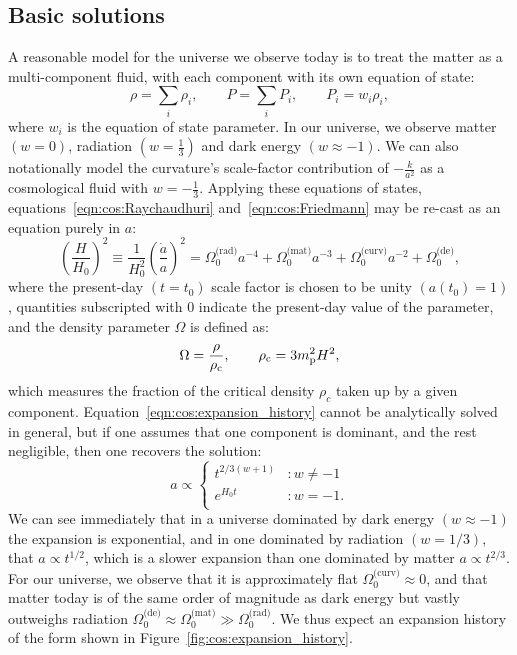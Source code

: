 \subsection{Basic solutions}
A reasonable model for the universe we observe today is to treat the matter as a multi-component fluid, with each component with its own equation of state:
\begin{equation}
  \rho = \sum_i \rho_i, \qquad P = \sum_i P_i, \qquad P_i = w_i \rho_i,
  \label{eqn:cos:multi_component}
\end{equation}
where \(w_i\) is the equation of state parameter. In our universe, we observe matter \((w=0)\), radiation \((w=\frac{1}{3})\) and dark energy \((w\approx
-1)\). We can also notationally model the curvature's scale-factor contribution of \(-\frac{k}{a^2}\) as a cosmological fluid with \(w=-\frac{1}{3}\). Applying these equations of states, equations~\eqref{eqn:cos:Raychaudhuri} and~\eqref{eqn:cos:Friedmann} may be re-cast as an equation purely in \(a\):
\begin{equation}
  {\left( \frac{H}{H_0} \right)}^2 \equiv 
  \frac{1}{H_0^2}{\left( \frac{\dot{a}}{a} \right)}^2 =
  \Omega^\text{(rad)}_0 a^{-4} +
  \Omega^\text{(mat)}_0 a^{-3} + 
  \Omega^\text{(curv)}_0 a^{-2} +
  \Omega^\text{(de)}_0,
  \label{eqn:cos:expansion_history}
\end{equation}
where the present-day \((t=t_0)\) scale factor is chosen to be unity \((a(t_0)=1)\), quantities subscripted with \(0\) indicate the present-day  value of the parameter, and the density parameter \(\Omega\) is defined as:
\begin{equation}
  \Omega = \frac{\rho}{\rho_\mathrm{c}}, \qquad \rho_\mathrm{c} = {3m_{\mathrm{p}}^2H^2},
  \label{eqn:cos:omega_def}
\end{equation}
which measures the fraction of the critical density \(\rho_c\) taken up by a given component. Equation~\eqref{eqn:cos:expansion_history} cannot be analytically solved in general, but if one assumes that one component is dominant, and the rest negligible, then one recovers the solution:
\begin{equation}
  a  \propto
  \left\{
  \begin{array}{ll}
    t^{2/3(w+1)} &: w\ne-1\\
    e^{H_0 t} &: w=-1.\\
  \end{array}
  \right.
\end{equation}
We can see immediately that in a universe dominated by dark energy \({(w\approx-1)}\) the expansion is exponential, and in one dominated by radiation \({(w=1/3)}\), that \({a\propto t^{1/2}}\), which is a slower expansion than one dominated by matter \({a\propto t^{2/3}}\). For our universe, we observe that it is approximately flat \({\Omega_0^{\text{(curv)}}\approx0}\), and that matter today is of the same order of magnitude as dark energy but vastly outweighs radiation \({\Omega_0^{\text{(de)}} \approx \Omega_0^{\text{(mat)}} \gg \Omega_0^{\text{(rad)}}}\). We thus expect an expansion history of the form shown in Figure~\ref{fig:cos:expansion_history}.


